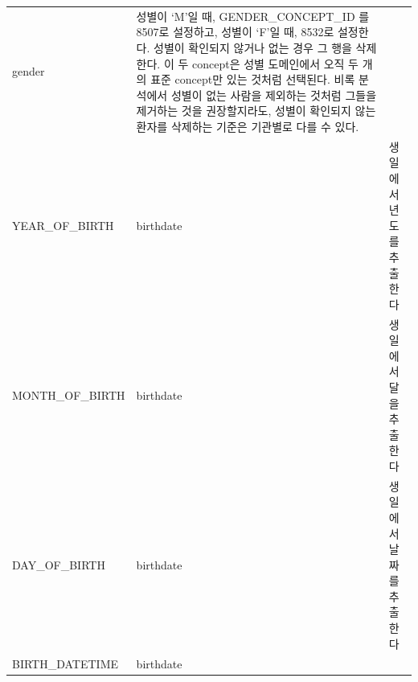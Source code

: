 \documentclass[10.5pt]{book}
\theoremstyle{definition}
\theoremstyle{definition}
\theoremstyle{definition}
\theoremstyle{remark}
\begin{document}
\begin{longtable}[]{@{}lll@{}}
\begin{minipage}[t]{0.13\columnwidth}
gender\strut
\end{minipage} & \begin{minipage}[t]{0.50\columnwidth}\raggedright\strut
성별이 `M'일 때, GENDER\_CONCEPT\_ID 를 8507로 설정하고, 성별이 `F'일
때, 8532로 설정한다. 성별이 확인되지 않거나 없는 경우 그 행을 삭제한다.
이 두 concept은 성별 도메인에서 오직 두 개의 표준 concept만 있는 것처럼
선택된다. 비록 분석에서 성별이 없는 사람을 제외하는 것처럼 그들을
제거하는 것을 권장할지라도, 성별이 확인되지 않는 환자를 삭제하는 기준은
기관별로 다를 수 있다.\strut
\end{minipage}\tabularnewline
\begin{minipage}[t]{0.28\columnwidth}\raggedright\strut
YEAR\_OF\_BIRTH\strut
\end{minipage} & \begin{minipage}[t]{0.13\columnwidth}\raggedright\strut
birthdate\strut
\end{minipage} & \begin{minipage}[t]{0.50\columnwidth}\raggedright\strut
생일에서 년도를 추출한다\strut
\end{minipage}\tabularnewline
\begin{minipage}[t]{0.28\columnwidth}\raggedright\strut
MONTH\_OF\_BIRTH\strut
\end{minipage} & \begin{minipage}[t]{0.13\columnwidth}\raggedright\strut
birthdate\strut
\end{minipage} & \begin{minipage}[t]{0.50\columnwidth}\raggedright\strut
생일에서 달을 추출한다\strut
\end{minipage}\tabularnewline
\begin{minipage}[t]{0.28\columnwidth}\raggedright\strut
DAY\_OF\_BIRTH\strut
\end{minipage} & \begin{minipage}[t]{0.13\columnwidth}\raggedright\strut
birthdate\strut
\end{minipage} & \begin{minipage}[t]{0.50\columnwidth}\raggedright\strut
생일에서 날짜를 추출한다\strut
\end{minipage}\tabularnewline
\begin{minipage}[t]{0.28\columnwidth}\raggedright\strut
BIRTH\_DATETIME\strut
\end{minipage} & \begin{minipage}[t]{0.13\columnwidth}\raggedright\strut
birthdate\strut
\end{minipage} & \begin{minipage}[t]{0.50\columnwidth}\raggedright\strut

\end{minipage}
\end{longtable}
\end{document}
